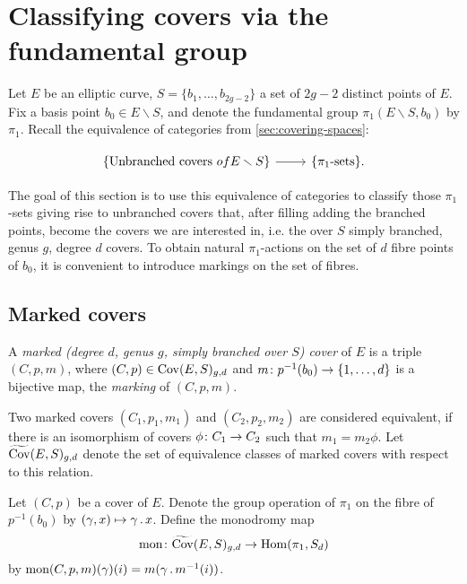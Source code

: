 \section{Classifying covers via the fundamental group}

Let $E$ be an elliptic curve, $S=\{b_1,\dotsc,b_{2g-2}\}$ a set of $2g-2$ distinct points of $E$. Fix a basis point $b_0\in E\smallsetminus S$, and denote the fundamental group $\pi_1(E\smallsetminus S, b_0)$ by $\pi_1$.
Recall the equivalence of categories from \ref{sec:covering-spaces}:

\[
 \begin{tikzcd}
  \{\text{Unbranched covers } of E\smallsetminus S\} \arrow{r} & \{\pi_1\text{-sets}\}.
 \end{tikzcd}
\]

The goal of this section is to use this equivalence of categories to classify those $\pi_1$-sets giving rise to unbranched covers that, after filling adding the branched points, become the covers we are interested in, i.e. the over $S$ simply branched, genus $g$, degree $d$ covers. To obtain natural $\pi_1$-actions on the set of $d$ fibre points of $b_0$, it is convenient to introduce markings on the set of fibres.

\subsection{Marked covers}

\begin{defi}
 A \emph{marked (degree $d$, genus $g$, simply branched over $S$) cover} of $E$ is a triple $(C,p,m)$, where $(C,p)\in \operatorname{Cov}(E,S)_{g,d}$ and $m\colon p^{-1}(b_0)\to \{1,\dotsc,d\}$ is a bijective map, the \emph{marking} of $(C,p,m)$.
 
 Two marked covers $(C_1,p_1,m_1)$ and $(C_2,p_2,m_2)$ are considered equivalent, if there is an isomorphism of covers $\phi\colon C_1 \to C_2$ such that $m_1=m_2\phi$. Let $\widetilde{\operatorname{Cov}}(E,S)_{g,d}$ denote the set of equivalence classes of marked covers with respect to this relation.
\end{defi}

\begin{defi}
 Let $(C,p)$ be a cover of $E$. Denote the group operation of $\pi_1$ on the fibre of $p^{-1}(b_0)$ by $(\gamma,x)\mapsto \gamma\,.\, x$. Define the monodromy map \[\text{mon}\colon \widetilde{\operatorname{Cov}}(E,S)_{g,d} \to \operatorname{Hom}(\pi_1, S_d)\]
 by $\text{mon}(C,p,m)(\gamma)(i)=m(\gamma\,.\, m^{-1}(i))$.
\end{defi}

